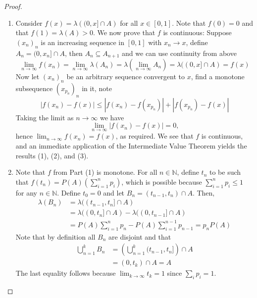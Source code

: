 \documentclass[11pt]{article}
\newcommand{\N}{\mathbb{N}}
\newcommand{\seq}{\subseteq}
\newcommand{\ic}{\cap}
\newcommand{\abs}[1]{\left\lvert#1\right\rvert}
\begin{document}
\begin{proof}
    \begin{enumerate} 
        \item Consider $f(x) = \lambda \left ( (0, x] \ic A \right )$ for all $x \in [0, 1]$. Note that $f(0) = 0$ and that $f(1) = \lambda (A) > 0$. We now prove that $f$ is continuous: Suppose $(x_n)_n$ is an increasing sequence in $[0, 1]$ with $x_n \to x$, define $A_n = (0, x_n] \ic A$, then $A_n \seq A_{n+1}$ and we can use continuity from above  
        \[ \lim_{n \to \infty} f(x_n) = \lim_{n \to \infty} \lambda (A_n) = \lambda \left ( \lim_{n \to \infty} A_n \right) = \lambda ((0, x] \ic A) = f(x) \]
        Now let $(x_n)_n$ be an arbitrary sequence convergent to $x$, find a monotone subsequence $(x_{p_n})_n$ in it, note
        \[ \abs{f(x_n) - f(x)} \leq \abs{f(x_n) - f(x_{p_n})} + \abs{f(x_{p_n}) - f(x)} \]
        Taking the limit as $n \to \infty$ we have
        \[ \lim_{n \to \infty} \abs{f(x_n) - f(x)} = 0, \]
        hence $\lim_{n \to \infty} f(x_n) = f(x)$, as required. We see that $f$ is continuous, and an immediate application of the Intermediate Value Theorem yields the results (1), (2), and (3).
        \item Note that $f$ from Part (1) is monotone. For all $n \in \N$, define $t_n$ to be such that $f(t_n) = P(A) \left ( \sum_{i=1}^{n} p_{i} \right )$, which is possible because $\sum_{i=1}^{n} p_{i} \leq 1$ for any $n \in \N$. Define $t_0 = 0$ and let $B_n = (t_{n-1}, t_n) \ic A$. Then,
        \begin{align*}
            \lambda (B_n) &= \lambda ((t_{n-1}, t_n] \ic A) \\
            &= \lambda ((0, t_n] \ic A) - \lambda ((0, t_{n-1}] \ic A) \\
            &= P(A) \sum_{i=1}^{n} p_n - P(A) \sum_{i=1}^{n-1} p_{n-1} = p_n P(A)
        \end{align*}
        Note that by definition all $B_n$ are disjoint and that
        \begin{align*}
            \bigcup_{n=1}^{k} B_n &= \left ( \bigcup_{n=1}^{k} (t_{n-1}, t_n] \right ) \ic A \\
            &= (0, t_k) \ic A = A
        \end{align*}
        The last equality follows because $\lim_{k \to \infty} t_k = 1$ since $\sum_i p_i = 1$.
    \end{enumerate}
\end{proof}
\end{document}
